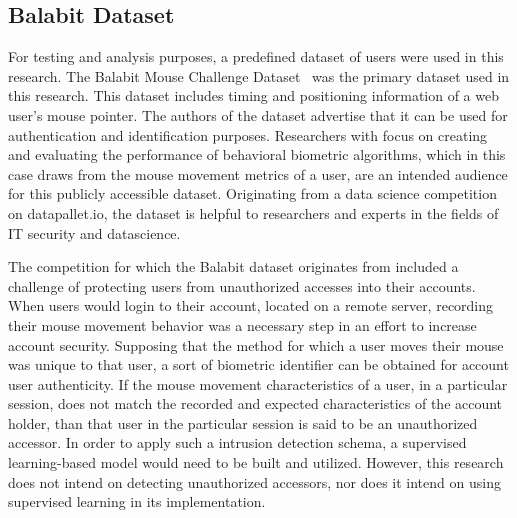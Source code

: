 \subsection{Balabit Dataset}\label{subsec:balabit-dataset}
For testing and analysis purposes, a predefined dataset of users were used in this research.
The Balabit Mouse Challenge Dataset~\cite{balabit_dataset} was the primary dataset used in this research.
This dataset includes timing and positioning information of a web user's mouse pointer.
The authors of the dataset advertise that it can be used for authentication and identification purposes.
Researchers with focus on creating and evaluating the performance of behavioral biometric algorithms, which in this case draws from the mouse movement metrics of a user, are an intended audience for this publicly accessible dataset.
Originating from a data science competition on datapallet.io, the dataset is helpful to researchers and experts in the fields of IT security and datascience.

The competition for which the Balabit dataset originates from included a challenge of protecting users from unauthorized accesses into their accounts.
When users would login to their account, located on a remote server, recording their mouse movement behavior was a necessary step in an effort to increase account security.
Supposing that the method for which a user moves their mouse was unique to that user, a sort of biometric identifier can be obtained for account user authenticity.
If the mouse movement characteristics of a user, in a particular session, does not match the recorded and expected characteristics of the account holder, than that user in the particular session is said to be an unauthorized accessor.
In order to apply such a intrusion detection schema, a supervised learning-based model would need to be built and utilized.
However, this research does not intend on detecting unauthorized accessors, nor does it intend on using supervised learning in its implementation.

